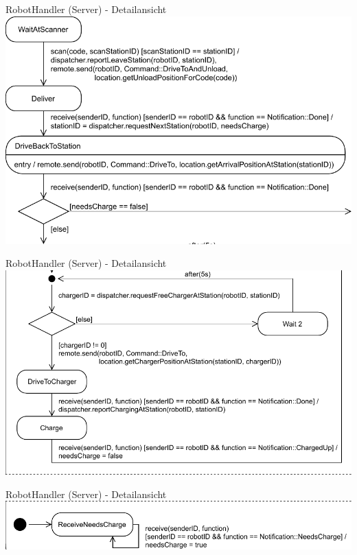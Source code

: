\documentclass{beamer}
\begin{document}
\begin{frame}{RobotHandler (Server) - Detailansicht}
\includegraphics[height=0.75\textheight]{PDF/RobotHandler2.pdf}
\end{frame}	
\begin{frame}{RobotHandler (Server) - Detailansicht}
\includegraphics[height=0.75\textheight]{PDF/RobotHandler3.pdf}
\end{frame}	
\begin{frame}{RobotHandler (Server) - Detailansicht}
\includegraphics[width=\linewidth]{PDF/RobotHandler4.pdf}
\end{frame}	
\end{document}

